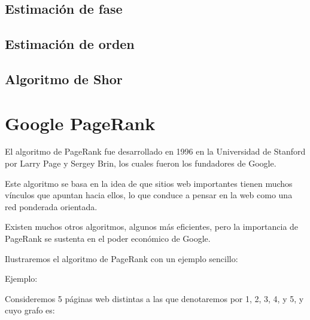 \documentclass[11pt, spanish]{report}
\begin{document}
\section{Estimación de fase}

\section{Estimación de orden}

\section{Algoritmo de Shor}

\chapter{Google PageRank}

El algoritmo de PageRank fue desarrollado en 1996 en la Universidad de Stanford por Larry Page y Sergey Brin, los cuales fueron los fundadores de Google.

Este algoritmo se basa en la idea de que sitios web importantes tienen muchos vínculos que apuntan hacia ellos, lo que conduce a pensar en la web como una red ponderada orientada.

Existen muchos otros algoritmos, algunos más eficientes, pero la importancia de PageRank se sustenta en el poder económico de Google.

Ilustraremos el algoritmo de PageRank con un ejemplo sencillo:

Ejemplo:

Consideremos 5 páginas web distintas a las que denotaremos por 1, 2, 3, 4, y 5, y cuyo grafo es:
\vspace{3cm}
\end{document}
